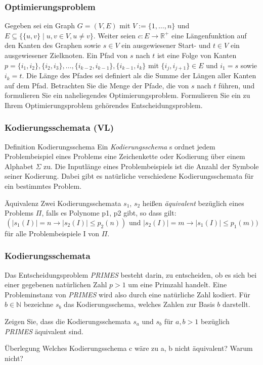 \documentclass{beamer}
\begin{document}
\begin{frame}
 \frametitle{Optimierungsproblem}
 Gegeben sei ein Graph $G=(V,E)$ mit $V:=\{1,\ldots,n\}$ und $E\subseteq \{\{u,v\} \mid u,v \in V, u\neq v\}$. Weiter seien $c:E \rightarrow \mathbb{R}^+$ eine Längenfunktion auf den Kanten des Graphen sowie $s\in V$ ein ausgewiesener Start- und $t\in V$ ein ausgewiesener Zielknoten. 
Ein Pfad von $s$ nach $t$ ist eine Folge von Kanten $p = \{i_1,i_2\},\{i_2,i_3\},\ldots,\{i_{k-2},i_{k-1}\},\{i_{k-1},i_k\}$ mit $\{i_j, i_{j+1}\} \in E$ und $i_1=s$ sowie $i_k=t$. 
Die Länge des Pfades sei definiert als die Summe der Längen aller Kanten auf dem Pfad. 
Betrachten Sie die Menge der Pfade, die von $s$ nach $t$ führen, und formulieren Sie ein naheliegendes Optimierungsproblem. 
Formulieren Sie ein zu Ihrem Optimierungsproblem gehörendes Entscheidungsproblem.
\end{frame}

\begin{frame}
 \frametitle{Kodierungsschemata (VL)}
 \begin{block}{Definition Kodierungsschema}
 Ein \emph{Kodierungsschema} s ordnet jedem Problembeispiel eines Problems eine Zeichenkette oder Kodierung über einem Alphabet $\Sigma$ zu. 
 Die Inputlänge eines Problembeispiels ist die Anzahl der Symbole seiner Kodierung.
 Dabei gibt es natürliche verschiedene Kodierungsschemata für ein bestimmtes Problem.
 \end{block}
 \begin{block}{Äquivalenz}
  Zwei Kodierungsschemata $s_1$, $s_2$ heißen \emph{äquivalent} bezüglich eines Problems $\Pi$, falls es Polynome p1, p2 gibt, so dass gilt:
  \[
   (|s_1(I)| = n \rightarrow |s_2(I)| \leq p_2(n))\mbox{ und } |s_2(I)| = m \rightarrow |s_1(I)| \leq p_1(m))
  \]
für alle Problembeispiele I von $\Pi$.
 \end{block}
\end{frame}

\begin{frame}
 \frametitle{Kodierungsschemata}
 Das Entscheidungsproblem \textit{PRIMES} besteht darin, zu entscheiden, ob es sich bei einer gegebenen natürlichen Zahl $p>1$ um eine Primzahl handelt. 
Eine Probleminstanz von \textit{PRIMES} wird also durch eine natürliche Zahl kodiert. 
Für $b\in \mathbb{N}$ bezeichne $s_b$ das Kodierungsschema, welches Zahlen zur Basis $b$ darstellt.

Zeigen Sie, dass die Kodierungsschemata $s_a$ und $s_b$ für $a,b>1$ bezüglich \textit{PRIMES} äquivalent sind.

\begin{block}{Überlegung}
 Welches Kodierungsschema c wäre zu a, b nicht äquivalent? Warum nicht?
\end{block}
\end{frame}
\end{document}
